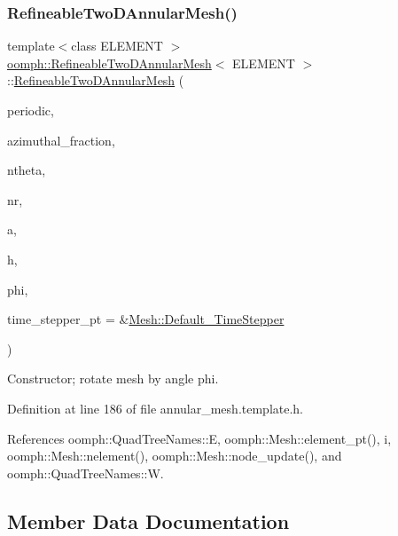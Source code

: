 \subsubsection{\texorpdfstring{Refineable\+Two\+D\+Annular\+Mesh()}{RefineableTwoDAnnularMesh()}\hspace{0.1cm}{\footnotesize\ttfamily [2/2]}}
{\footnotesize\ttfamily template$<$class E\+L\+E\+M\+E\+NT $>$ \\
\hyperlink{classoomph_1_1RefineableTwoDAnnularMesh}{oomph\+::\+Refineable\+Two\+D\+Annular\+Mesh}$<$ E\+L\+E\+M\+E\+NT $>$\+::\hyperlink{classoomph_1_1RefineableTwoDAnnularMesh}{Refineable\+Two\+D\+Annular\+Mesh} (\begin{DoxyParamCaption}\item[{const bool \&}]{periodic,  }\item[{const double \&}]{azimuthal\+\_\+fraction,  }\item[{const unsigned \&}]{ntheta,  }\item[{const unsigned \&}]{nr,  }\item[{const double \&}]{a,  }\item[{const double \&}]{h,  }\item[{const double \&}]{phi,  }\item[{\hyperlink{classoomph_1_1TimeStepper}{Time\+Stepper} $\ast$}]{time\+\_\+stepper\+\_\+pt = {\ttfamily \&\hyperlink{classoomph_1_1Mesh_a12243d0fee2b1fcee729ee5a4777ea10}{Mesh\+::\+Default\+\_\+\+Time\+Stepper}} }\end{DoxyParamCaption})\hspace{0.3cm}{\ttfamily [inline]}}



Constructor; rotate mesh by angle phi. 



Definition at line 186 of file annular\+\_\+mesh.\+template.\+h.



References oomph\+::\+Quad\+Tree\+Names\+::E, oomph\+::\+Mesh\+::element\+\_\+pt(), i, oomph\+::\+Mesh\+::nelement(), oomph\+::\+Mesh\+::node\+\_\+update(), and oomph\+::\+Quad\+Tree\+Names\+::W.



\subsection{Member Data Documentation}
\mbox{\label{classoomph_1_1RefineableTwoDAnnularMesh_abcf8125abca9f4e5659f03ceffcb9584}} 
